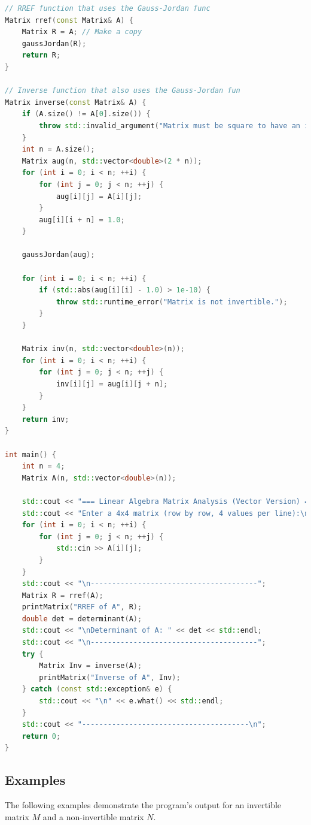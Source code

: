 \documentclass{article}
\begin{document}
\begin{lstlisting}[language=C++, caption={Modern C++ code for RREF, determinant, and inverse of a 4x4 matrix.}, label=lst:code, basicstyle=\footnotesize\ttfamily, breaklines=true]
// RREF function that uses the Gauss-Jordan func
Matrix rref(const Matrix& A) {
    Matrix R = A; // Make a copy
    gaussJordan(R);
    return R;
}

// Inverse function that also uses the Gauss-Jordan fun
Matrix inverse(const Matrix& A) {
    if (A.size() != A[0].size()) {
        throw std::invalid_argument("Matrix must be square to have an inverse.");
    }
    int n = A.size();
    Matrix aug(n, std::vector<double>(2 * n));
    for (int i = 0; i < n; ++i) {
        for (int j = 0; j < n; ++j) {
            aug[i][j] = A[i][j];
        }
        aug[i][i + n] = 1.0;
    }

    gaussJordan(aug);

    for (int i = 0; i < n; ++i) {
        if (std::abs(aug[i][i] - 1.0) > 1e-10) {
            throw std::runtime_error("Matrix is not invertible.");
        }
    }
    
    Matrix inv(n, std::vector<double>(n));
    for (int i = 0; i < n; ++i) {
        for (int j = 0; j < n; ++j) {
            inv[i][j] = aug[i][j + n];
        }
    }
    return inv;
}

int main() {
    int n = 4;
    Matrix A(n, std::vector<double>(n));

    std::cout << "=== Linear Algebra Matrix Analysis (Vector Version) ===\n";
    std::cout << "Enter a 4x4 matrix (row by row, 4 values per line):\n";
    for (int i = 0; i < n; ++i) {
        for (int j = 0; j < n; ++j) {
            std::cin >> A[i][j];
        }
    }
    std::cout << "\n---------------------------------------";
    Matrix R = rref(A);
    printMatrix("RREF of A", R);
    double det = determinant(A);
    std::cout << "\nDeterminant of A: " << det << std::endl;
    std::cout << "\n---------------------------------------";
    try {
        Matrix Inv = inverse(A);
        printMatrix("Inverse of A", Inv);
    } catch (const std::exception& e) {
        std::cout << "\n" << e.what() << std::endl;
    }
    std::cout << "---------------------------------------\n";
    return 0;
}
\end{lstlisting}
\subsection{Examples}
The following examples demonstrate the program's output for an invertible matrix $M$ and a non-invertible matrix $N$.
\end{document}
